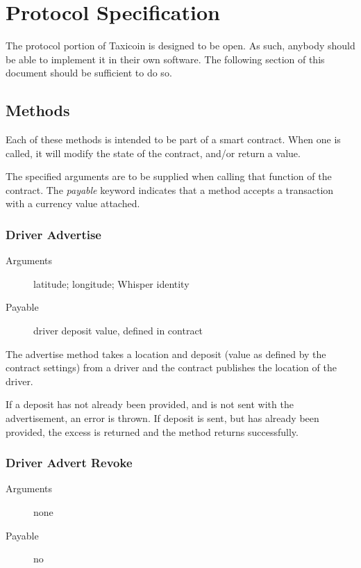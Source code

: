 \section{Protocol Specification}

The protocol portion of Taxicoin is designed to be open. As such, anybody should be able to implement it in their own software. The following section of this document should be sufficient to do so.

\subsection{Methods}

Each of these methods is intended to be part of a smart contract. When one is called, it will modify the state of the contract, and/or return a value.

The specified arguments are to be supplied when calling that function of the contract. The \textit{payable} keyword indicates that a method accepts a transaction with a currency value attached.

\subsubsection{Driver Advertise}

\begin{description}
	\item [Arguments] latitude; longitude; Whisper identity
	\item [Payable] driver deposit value, defined in contract
\end{description}

The advertise method takes a location and deposit (value as defined by the contract settings) from a driver and the contract publishes the location of the driver.

If a deposit has not already been provided, and is not sent with the advertisement, an error is thrown. If deposit is sent, but has already been provided, the excess is returned and the method returns successfully.

\subsubsection{Driver Advert Revoke}

\begin{description}
	\item [Arguments] none
	\item [Payable] no
\end{description}

